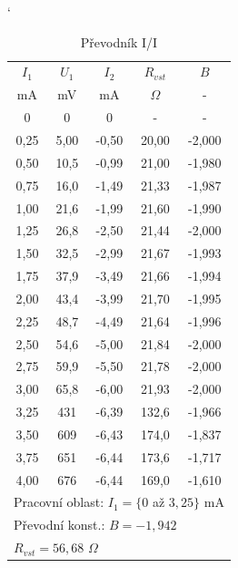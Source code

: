 \documentclass[a4paper, czech]{article}
\begin{document}
\begin{minipage}{0.48\textwidth}
    \begin{table}[H]
        \catcode`
        \centering
        \caption{Převodník I/I}
        \begin{tabular}{ccccc}
            \toprule
            $I_1$   & $U_1$   & $I_2$    & $R_{vst}$  & $B$      \\
            \cmidrule(rl){1-1}
            \cmidrule(rl){2-2}
            \cmidrule(rl){3-3}
            \cmidrule(rl){4-4}
            \cmidrule(rl){5-5}
            mA   & mV   & mA    & $\Omega$     & -      \\
            \midrule
            0    & 0    & 0     & -     & -      \\
            0,25 & 5,00 & -0,50 & 20,00 & -2,000 \\
            0,50 & 10,5 & -0,99 & 21,00 & -1,980 \\
            0,75 & 16,0 & -1,49 & 21,33 & -1,987 \\
            1,00 & 21,6 & -1,99 & 21,60 & -1,990 \\
            1,25 & 26,8 & -2,50 & 21,44 & -2,000 \\
            1,50 & 32,5 & -2,99 & 21,67 & -1,993 \\
            1,75 & 37,9 & -3,49 & 21,66 & -1,994 \\
            2,00 & 43,4 & -3,99 & 21,70 & -1,995 \\
            2,25 & 48,7 & -4,49 & 21,64 & -1,996 \\
            2,50 & 54,6 & -5,00 & 21,84 & -2,000 \\
            2,75 & 59,9 & -5,50 & 21,78 & -2,000 \\
            3,00 & 65,8 & -6,00 & 21,93 & -2,000 \\
            3,25 & 431  & -6,39 & 132,6 & -1,966 \\
            3,50 & 609  & -6,43 & 174,0 & -1,837 \\
            3,75 & 651  & -6,44 & 173,6 & -1,717 \\
            4,00 & 676  & -6,44 & 169,0 & -1,610 \\
            \bottomrule
            \multicolumn{5}{l}{Pracovní oblast: $I_1 = \{0$ až $3,25\}$ mA} \\
            \multicolumn{5}{l}{Převodní konst.: $B = -1,942$} \\
            \multicolumn{5}{l}{$R_{vst} = 56,68$ $\Omega$} \\
        \end{tabular}
    \end{table}
\end{minipage}
\end{document}
